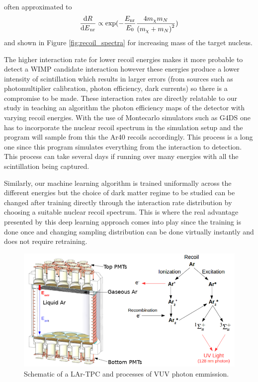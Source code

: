 \documentclass[11pt]{article} %
\begin{document}
often approximated to \cite{lewin1996review}
\begin{equation}
\frac{{\rm{d}}{R}}{{{\rm{d}}{E}}_{\mathrm{nr}}}\propto \exp (- \frac{{E}_{\mathrm{nr}}}{{E}_{0}} \frac{4{m}_{\chi }{m}_{N}}{{({m}_{\chi }+{m}_{N})}^{2}})
\end{equation}
and shown in Figure \ref{fig:recoil_spectra} for increasing mass of the target nucleus.
\\
\par The higher interaction rate for lower recoil energies makes it more probable to detect a WIMP candidate interaction
however these energies produce a lower intensity of scintillation which results in larger errors
 (from sources such as photomultiplier calibration, photon efficiency, dark currents) so there is a compromise to be made.
These interaction rates are directly relatable to our study in teaching an algorithm the photon efficiency maps of the detector
with varying recoil energies.
With the use of Montecarlo simulators such as G4DS one has to incorporate the nuclear recoil spectrum in the simulation setup
and the program will sample from this the Ar40 recoils accordingly.
This process is a long one since this program simulates everything from the interaction to detection.
This process can take several days if running over many energies with all the scintillation being captured.
\\
\par Similarly, our machine learning algorithm is trained uniformally across the different energies but the choice of
dark matter regime to be studied can be changed after training directly through the interaction rate distribution by choosing a suitable nuclear recoil spectrum.
This is where the real advantage presented by this deep learning approach comes into play since the training is done once and changing
sampling distribution can be done virtually instantly and does not require retraining.
\\
\begin{figure}[H]
\centering
\includegraphics[scale=0.5]{images/detector.png}
\caption{\cite{edkins2017detailed} Schematic of a LAr-TPC and processes of VUV photon emmission.}
\label{fig:detector}
\end{figure}
\end{document}
